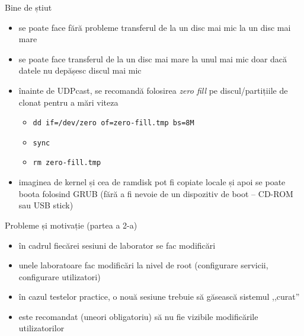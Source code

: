 \documentclass{simple}
\begin{document}
\begin{frame}{Bine de știut}
  \begin{itemize}
    \item se poate face fără probleme transferul de la un disc mai mic la un
      disc mai mare
    \item se poate face transferul de la un disc mai mare la unul mai mic doar
      dacă datele nu depășesc discul mai mic
    \item înainte de UDPcast, se recomandă folosirea \textit{zero fill} pe
      discul/partițiile de clonat pentru a mări viteza
      \begin{itemize}
        \item \texttt{dd if=/dev/zero of=zero-fill.tmp bs=8M}
        \item \texttt{sync}
        \item \texttt{rm zero-fill.tmp}
      \end{itemize}
    \item imaginea de kernel și cea de ramdisk pot fi copiate locale și apoi
      se poate boota folosind GRUB (fără a fi nevoie de un dispozitiv de boot
      -- CD-ROM sau USB stick)
  \end{itemize}
\end{frame}

\begin{frame}{Probleme și motivație (partea a 2-a)}
  \begin{itemize}
    \item în cadrul fiecărei sesiuni de laborator se fac modificări
    \item unele laboratoare fac modificări la nivel de root (configurare
      servicii, configurare utilizatori)
    \item în cazul testelor practice, o nouă sesiune trebuie să găsească
      sistemul ,,curat''
    \item este recomandat (uneori obligatoriu) să nu fie vizibile modificările
      utilizatorilor
  \end{itemize}
\end{frame}
\end{document}
